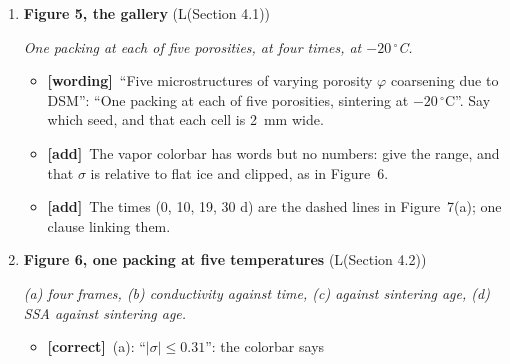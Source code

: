 \documentclass[11pt]{article}
\newcommand{\Pg}[3]{\item \textbf{#1} {\small(#2)}\par\textit{#3}}
\newcommand{\tC}{\textcolor{miss}{\textbf{[correct]}}\ }
\newcommand{\tG}{\textcolor{stale}{\textbf{[wording]}}\ }
\newcommand{\tA}{\textcolor{have}{\textbf{[add]}}\ }
\begin{document}
\begin{enumerate}
\begin{itemize}
    grains, $2d_0/R \approx 2.4\times10^{-5}$ for $R = 84~\mu$m, which is
    the top of the scale. Say this; a reader expects a saturated pore to be
    white.
  \item \tA \textbf{The starting neck.} The $t = 0$ frame shows overlapping
    grains with a neck of 28~$\mu$m. Say so; Section~3.2 and Appendix~B
    rest on it (provisional until the tangent-start run).
  \item \tC \textbf{The $t^{1/3}$ curve} is called ``the power law
    corresponding to the theorized sublimation/desublimation neck growth'':
    cite Demmenie et al.\ (2025), as Section~3.2 does (and a classical
    source, Introduction paragraph~4). Appendix~B finds 0.29 for
    the sharp-interface law at this grain size and $\alpha_c$; if the text
    compares with 0.29, the figure should show that curve, or both. Decide
    once the tangent-start run is in.
  \item \tA The legend writes $C(t+t_0)^{a}$; say what $t_0$ is (fitted)
    and the fit window (20~min to 100~h, as Section~3.2 says); temperature $-20\,^{\circ}$C, $R = 84~\mu$m,
    $\alpha_c = 10^{-3}$; the numbered circles mark the frames in (a).
  \item \tG ``An isolated ice grain pair shown undergoing sintering shown'':
    ``Two equal ice grains sintering in saturated air, at $t = 0$ (left)
    and 100~h (right)''. ``filed'', ``the the''.
  \end{itemize}
\Pg{Figure 5, the gallery}{L(Section 4.1)}{One packing at each of five porosities, at four times, at $-20\,^{\circ}$C.}
  \begin{itemize}
  \item \tG ``Five microstructures of varying porosity $\varphi$ coarsening
    due to DSM'': ``One packing at each of five porosities, sintering at
    $-20\,^{\circ}$C''. Say which seed, and that each cell is 2~mm wide.
  \item \tA The vapor colorbar has words but no numbers: give the range, and
    that $\sigma$ is relative to flat ice and clipped, as in Figure~6.
  \item \tA The times (0, 10, 19, 30 d) are the dashed lines in
    Figure~7(a); one clause linking them.
  \end{itemize}
\Pg{Figure 6, one packing at five temperatures}{L(Section 4.2)}{(a) four frames, (b) conductivity against time, (c) against sintering age, (d) SSA against sintering age.}
  \begin{itemize}
  \item \tC (a): ``$|\sigma| \le 0.31$'': the colorbar says

\end{itemize}
\end{enumerate}
\end{document}

